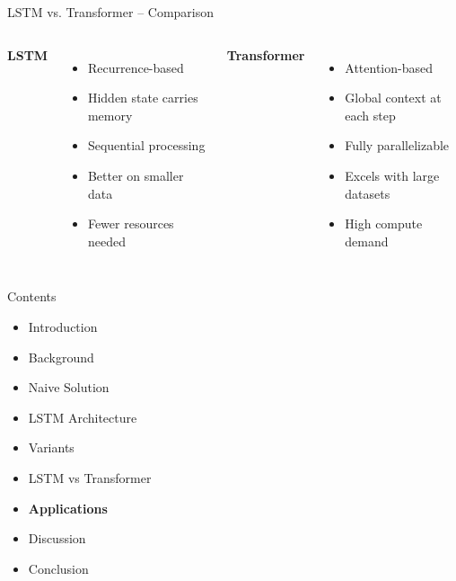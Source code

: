 \documentclass[10pt, aspectratio=169]{beamer}
\begin{document}
\begin{frame}[t]{LSTM vs. Transformer – Comparison}
\vspace{1em}
\begin{columns}
\textbf{LSTM}
\begin{itemize}
  \item Recurrence-based
  \item Hidden state carries memory
  \item Sequential processing
  \item Better on smaller data
  \item Fewer resources needed
\end{itemize}

\textbf{Transformer}
\begin{itemize}
  \item Attention-based
  \item Global context at each step
  \item Fully parallelizable
  \item Excels with large datasets
  \item High compute demand
\end{itemize}
\end{columns}
\end{frame}

\begin{frame}[t]{Contents}
\begin{itemize}
    \item Introduction
    \item Background
    \item Naive Solution
    \item LSTM Architecture
    \item Variants
    \item LSTM vs Transformer
    \item \textbf{Applications}
    \item Discussion
    \item Conclusion
\end{itemize}
\end{frame}
\end{document}
